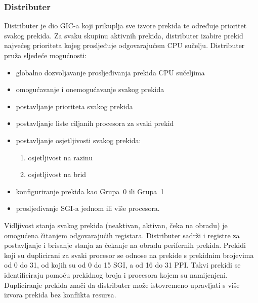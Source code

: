 \documentclass[times, utf8, diplomski, numeric]{fer}
\begin{document}
\subsubsection{Distributer}
Distributer je dio GIC-a koji prikuplja sve izvore prekida te određuje prioritet svakog prekida. Za svaku skupinu aktivnih
prekida, distributer izabire prekid najvećeg prioriteta kojeg prosljeđuje odgovarajućem CPU sučelju. Distributer pruža
sljedeće mogućnosti:
\begin{itemize}
  \item{globalno dozvoljavanje prosljeđivanja prekida CPU sučeljima}
  \item{omogućavanje i onemogućavanje svakog prekida}
  \item{postavljanje prioriteta svakog prekida}
  \item{postavljanje liste ciljanih procesora za svaki prekid}
  \item{postavljanje osjetljivosti svakog prekida:}
  \begin{enumerate}
    \item{osjetljivost na razinu}
    \item{osjetljivost na brid}
  \end{enumerate}
  \item{konfiguriranje prekida kao Grupa~0 ili Grupa~1}
  \item{prosljeđivanje SGI-a jednom ili više procesora.}
\end{itemize}
Vidljivost stanja svakog prekida (neaktivan, aktivan, čeka na obradu) je omogućena čitanjem odgovarajućih registara.
Distributer sadrži i registre za postavljanje i brisanje stanja za čekanje na obradu perifernih prekida. Prekidi koji
su duplicirani za svaki procesor se odnose na prekide s prekidnim brojevima od 0 do 31, od kojih su od 0 do 15 SGI, a
od 16 do 31 PPI. Takvi prekidi se identificiraju pomoću prekidnog broja i procesora kojem su namijenjeni. Dupliciranje
prekida znači da distributer može istovremeno upravljati s više izvora prekida bez konflikta resursa.
\end{document}
